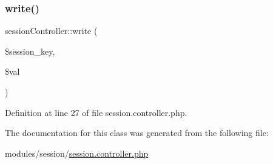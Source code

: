 \mbox{\label{classsessionController_a05f09c961d684c81c6b192fff5005407}} 
\subsubsection{\texorpdfstring{write()}{write()}}
{\footnotesize\ttfamily session\+Controller\+::write (\begin{DoxyParamCaption}\item[{}]{\$session\+\_\+key,  }\item[{}]{\$val }\end{DoxyParamCaption})}



Definition at line 27 of file session.\+controller.\+php.



The documentation for this class was generated from the following file\+:\begin{DoxyCompactItemize}
\item 
modules/session/\hyperlink{session_8controller_8php}{session.\+controller.\+php}\end{DoxyCompactItemize}
